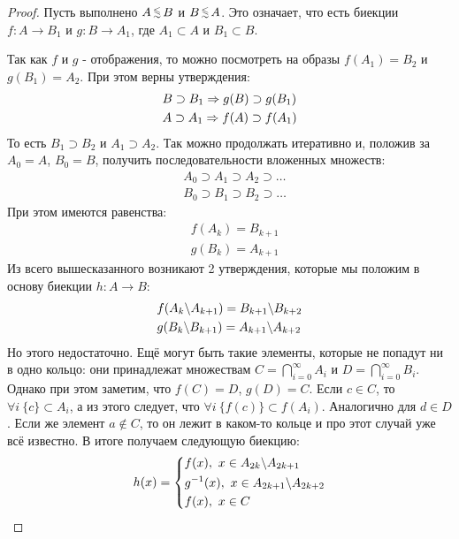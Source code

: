 \begin{proof}
	Пусть выполнено $A \leqsim B$ и $B \leqsim A$. Это означает, что есть биекции $f \colon A \to B_1$ и $g \colon B \to A_1$, где $A_1 \subset A$ и $B_1 \subset B$.
	
	Так как $f$ и $g$ - отображения, то можно посмотреть на образы $f(A_1) = B_2$ и $g(B_1) = A_2$. При этом верны утверждения:
	\begin{align*}
		&{B \supset B_1 \Rightarrow g(B) \supset g(B_1)}
		\\
		&{A \supset A_1 \Rightarrow f(A) \supset f(A_1)}
	\end{align*}
	То есть $B_1 \supset B_2$ и $A_1 \supset A_2$. Так можно продолжать итеративно и, положив за $A_0 = A$, $B_0 = B$, получить последовательности вложенных множеств:
	\begin{align*}
		&{A_0 \supset A_1 \supset A_2 \supset \ldots}
		\\
		&{B_0 \supset B_1 \supset B_2 \supset \ldots}
	\end{align*}
	При этом имеются равенства:
	\begin{align*}
		&{f(A_k) = B_{k + 1}}
		\\
		&{g(B_k) = A_{k + 1}}
	\end{align*}
	Из всего вышесказанного возникают 2 утверждения, которые мы положим в основу биекции $h \colon A \to B$:
	\begin{align*}
	&{f(A_k \backslash A_{k + 1}) = B_{k + 1} \backslash B_{k + 2}}
	\\
	&{g(B_k \backslash B_{k + 1}) = A_{k + 1} \backslash A_{k + 2}}
	\end{align*}
	Но этого недостаточно. Ещё могут быть такие элементы, которые не попадут ни в одно кольцо: они принадлежат множествам $C = \bigcap\limits_{i = 0}^\infty A_i$ и $D = \bigcap\limits_{i = 0}^\infty B_i$. Однако при этом заметим, что $f(C) = D$, $g(D) = C$. Если $c \in C$, то $\forall i\ \{c\} \subset A_i$, а из этого следует, что $\forall i\ \{f(c)\} \subset f(A_i)$. Аналогично для $d \in D$. Если же элемент $a \notin C$, то он лежит в каком-то кольце и про этот случай уже всё известно. В итоге получаем следующую биекцию:
	\[
		h(x) = \left\{\begin{aligned}
			&{f(x),\ x \in A_{2k} \backslash A_{2k + 1}}
			\\
			&{g^{-1}(x),\ x \in A_{2k + 1} \backslash A_{2k + 2}}
			\\
			&{f(x),\ x \in C}
		\end{aligned}\right.
	\]
\end{proof}